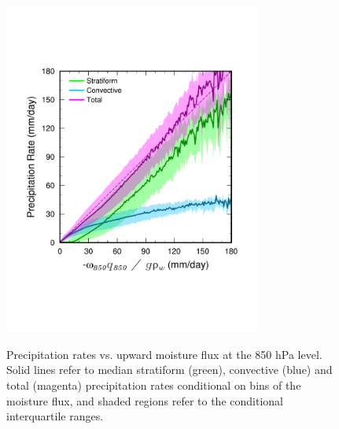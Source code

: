 \documentclass[times]{qjrms4}
\begin{document}
\begin{figure}
\begin{center}
\noindent\includegraphics[width=20pc,angle=0]{figs/temp_mflux.pdf}\\
\end{center}
\caption{Precipitation rates vs. upward moisture flux at the 850 hPa level. Solid lines refer to median stratiform (green), convective (blue) and total (magenta) precipitation rates conditional on bins of the moisture flux, and shaded regions refer to the conditional interquartile ranges.}
\label{fig:mflux}
\end{figure}
\end{document}
